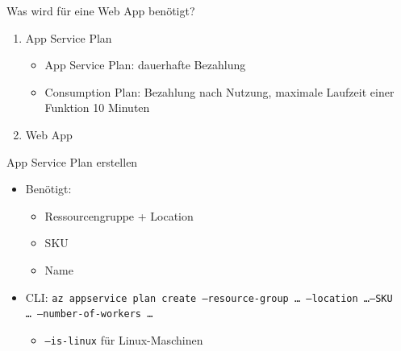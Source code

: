 

\begin{flashcard}[Definition]{Was wird für eine Web App benötigt?}
    \begin{enumerate}
        \item App Service Plan
            \begin{itemize}
                \item App Service Plan: dauerhafte Bezahlung
                \item Consumption Plan: Bezahlung nach Nutzung, maximale Laufzeit einer Funktion 10 Minuten
            \end{itemize}
        \item Web App
    \end{enumerate}
\end{flashcard}



\begin{flashcard}[Definition]{App Service Plan erstellen}
    \begin{itemize}
        \item Benötigt:
        \begin{itemize}
            \item Ressourcengruppe + Location
            \item SKU
            \item Name
        \end{itemize}
        \item CLI: \texttt{az appservice plan create --resource-group \ldots\ --location \ldots --SKU \ldots\ --number-of-workers \ldots}
            \begin{itemize}
                \item \texttt{--is-linux} für Linux-Maschinen
            \end{itemize}
    \end{itemize}
\end{flashcard}

